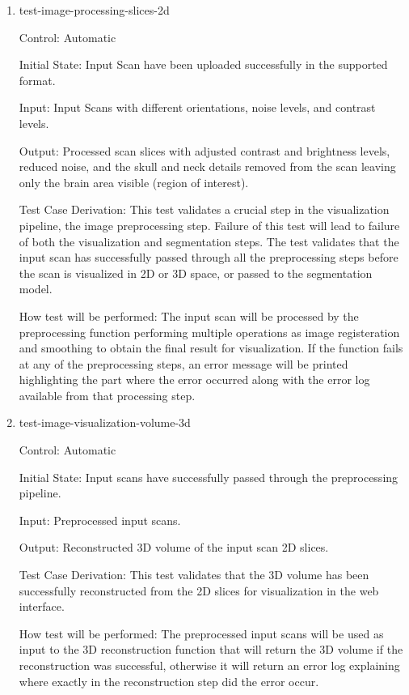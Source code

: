 \documentclass[12pt, titlepage]{article}
\begin{document}
\begin{enumerate}

  \item{test-image-processing-slices-2d}

        Control: Automatic

        Initial State: Input Scan have been uploaded successfully in the supported format.

        Input: Input Scans with different orientations, noise levels, and contrast levels.

        Output: Processed scan slices with adjusted contrast and brightness levels, reduced noise, and the skull and neck
        details removed from the scan leaving only the brain area visible (region of interest).

        Test Case Derivation: This test validates a crucial step in the visualization pipeline, the image preprocessing step.
        Failure of this test will lead to failure of both the visualization and segmentation steps. The test validates that the
        input scan has successfully passed through all the preprocessing steps before the scan is visualized in 2D or 3D space, or passed to the
        segmentation model.

        How test will be performed: The input scan will be processed by the preprocessing function performing
        multiple operations as image registeration and smoothing to obtain the final result for visualization.
        If the function fails at any of the preprocessing steps, an error message will be printed highlighting
        the part where the error occurred along with the error log available from that processing step.

  \item{test-image-visualization-volume-3d}

        Control: Automatic

        Initial State: Input scans have successfully passed through the preprocessing pipeline.

        Input: Preprocessed input scans.

        Output: Reconstructed 3D volume of the input scan 2D slices.

        Test Case Derivation: This test validates that the 3D volume has been successfully reconstructed from the 2D slices
        for visualization in the web interface.

        How test will be performed: The preprocessed input scans will be used as input to the 3D reconstruction function that
        will return the 3D volume if the reconstruction was successful, otherwise it will return an error log explaining where exactly
        in the reconstruction step did the error occur.


\end{enumerate}
\end{document}
